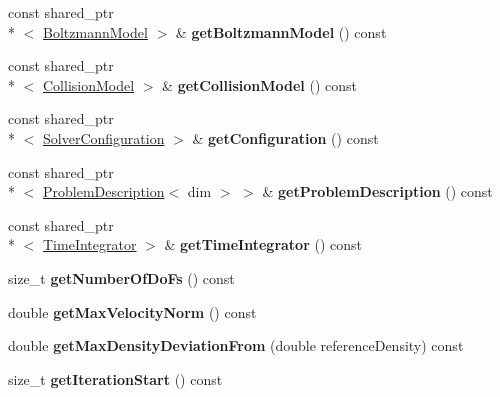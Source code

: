 \begin{DoxyCompactItemize}
\item 
\hypertarget{classnatrium_1_1CFDSolver_a3733dbd256b6d38659cee3cb044c1446}{const shared\-\_\-ptr\\*
$<$ \hyperlink{classnatrium_1_1BoltzmannModel}{Boltzmann\-Model} $>$ \& {\bfseries get\-Boltzmann\-Model} () const }\label{classnatrium_1_1CFDSolver_a3733dbd256b6d38659cee3cb044c1446}

\item 
\hypertarget{classnatrium_1_1CFDSolver_abb4b632b524bd68afcdff7d54c2d3d97}{const shared\-\_\-ptr\\*
$<$ \hyperlink{classnatrium_1_1CollisionModel}{Collision\-Model} $>$ \& {\bfseries get\-Collision\-Model} () const }\label{classnatrium_1_1CFDSolver_abb4b632b524bd68afcdff7d54c2d3d97}

\item 
\hypertarget{classnatrium_1_1CFDSolver_a413691491ac82f384a03293be2294de5}{const shared\-\_\-ptr\\*
$<$ \hyperlink{classnatrium_1_1SolverConfiguration}{Solver\-Configuration} $>$ \& {\bfseries get\-Configuration} () const }\label{classnatrium_1_1CFDSolver_a413691491ac82f384a03293be2294de5}

\item 
\hypertarget{classnatrium_1_1CFDSolver_a8b1131e8fd6b022bea5ddce72469c289}{const shared\-\_\-ptr\\*
$<$ \hyperlink{classnatrium_1_1ProblemDescription}{Problem\-Description}$<$ dim $>$ $>$ \& {\bfseries get\-Problem\-Description} () const }\label{classnatrium_1_1CFDSolver_a8b1131e8fd6b022bea5ddce72469c289}

\item 
\hypertarget{classnatrium_1_1CFDSolver_ad6e0c772ffa335f28699bac489d3a837}{const shared\-\_\-ptr\\*
$<$ \hyperlink{classnatrium_1_1TimeIntegrator}{Time\-Integrator} $>$ \& {\bfseries get\-Time\-Integrator} () const }\label{classnatrium_1_1CFDSolver_ad6e0c772ffa335f28699bac489d3a837}

\item 
\hypertarget{classnatrium_1_1CFDSolver_a74d459ef4f43d42e04ceb2178bb006f4}{size\-\_\-t {\bfseries get\-Number\-Of\-Do\-Fs} () const }\label{classnatrium_1_1CFDSolver_a74d459ef4f43d42e04ceb2178bb006f4}

\item 
\hypertarget{classnatrium_1_1CFDSolver_ae9c44bb0f33e2c73ee96fbe100061842}{double {\bfseries get\-Max\-Velocity\-Norm} () const }\label{classnatrium_1_1CFDSolver_ae9c44bb0f33e2c73ee96fbe100061842}

\item 
\hypertarget{classnatrium_1_1CFDSolver_ade641431988a82cb47d88a9d600e1c92}{double {\bfseries get\-Max\-Density\-Deviation\-From} (double reference\-Density) const }\label{classnatrium_1_1CFDSolver_ade641431988a82cb47d88a9d600e1c92}

\item 
\hypertarget{classnatrium_1_1CFDSolver_a33c4bfd63b8d457a5bc15f0c0da02c38}{size\-\_\-t {\bfseries get\-Iteration\-Start} () const }\label{classnatrium_1_1CFDSolver_a33c4bfd63b8d457a5bc15f0c0da02c38}

\end{DoxyCompactItemize}
